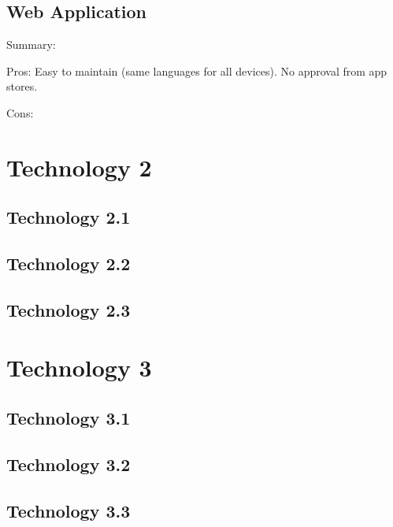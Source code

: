 \documentclass[draftclsnofoot,onecolumn,letterpaper,10pt,compsoc]{IEEEtran}
\begin{document}
	\subsection{Web Application}
    Summary:
    
    Pros:
    Easy to maintain (same languages for all devices).
    No approval from app stores.
    
    Cons:

\section{Technology 2}
	\subsection{Technology 2.1}
	\subsection{Technology 2.2}
	\subsection{Technology 2.3}

\section{Technology 3}
	\subsection{Technology 3.1}
	\subsection{Technology 3.2}
	\subsection{Technology 3.3}
\end{document}
